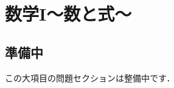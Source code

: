 \documentclass[../../ms_q.tex]{subfiles}
\begin{document}
\section{数学I～数と式～}

\subsection*{準備中}
この大項目の問題セクションは整備中です．
\end{document}
